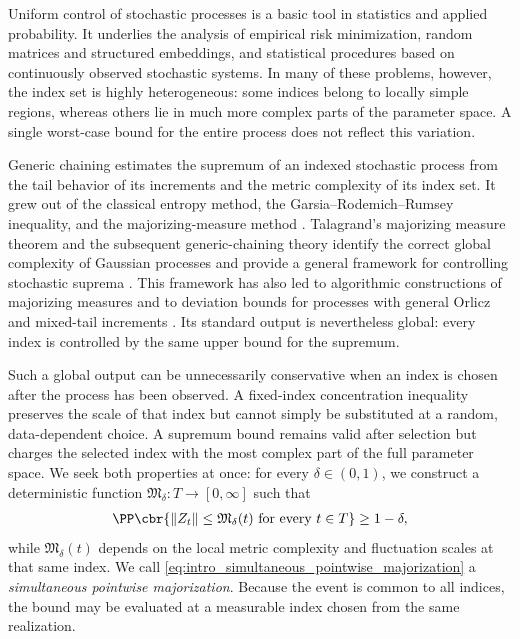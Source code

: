 \documentclass[11pt]{article}
\begin{document}
Uniform control of stochastic processes is a basic tool in statistics
and applied probability. It underlies the analysis of empirical risk
minimization, random matrices and structured embeddings, and statistical
procedures based on continuously observed stochastic systems. In many
of these problems, however, the index set is highly heterogeneous: some
indices belong to locally simple regions, whereas others lie in much
more complex parts of the parameter space. A single worst-case bound for
the entire process does not reflect this variation.

Generic chaining estimates the supremum of an indexed stochastic process
from the tail behavior of its increments and the metric complexity of
its index set. It grew out of the classical entropy method, the
Garsia--Rodemich--Rumsey inequality, and the majorizing-measure method
\citep{dudley1967sizes,garsia1971real,fernique1971regularite,
preston1972continuity,fernique1975regularite}. Talagrand's majorizing
measure theorem and the subsequent generic-chaining theory identify the
correct global complexity of Gaussian processes and provide a general
framework for controlling stochastic suprema
\citep{talagrand1987regularity,talagrand1992simple,
talagrand1994constructions,talagrand1996majorizing,
talagrand2001without,talagrand2005generic}. This framework has also led
to algorithmic constructions of majorizing measures and to deviation
bounds for processes with general Orlicz and mixed-tail increments
\citep{talagrand1990sample,borst2021optimizer,dirksen2015tail}. Its
standard output is nevertheless global: every index is controlled by
the same upper bound for the supremum.

Such a global output can be unnecessarily conservative when an index is
chosen after the process has been observed. A fixed-index concentration
inequality preserves the scale of that index but cannot simply be
substituted at a random, data-dependent choice. A supremum bound remains
valid after selection but charges the selected index with the most
complex part of the full parameter space. We seek both properties at
once: for every $\delta\in(0,1)$, we construct a deterministic function
$\mathfrak M_\delta:T\to[0,\infty]$ such that
\begin{align}
\PP\cbr{
\|Z_t\|\le \mathfrak M_\delta(t)
\text{ for every }t\in T
}
\ge 1-\delta,
\label{eq:intro_simultaneous_pointwise_majorization}
\end{align}
while $\mathfrak M_\delta(t)$ depends on the local metric complexity and
fluctuation scales at that same index. We call
\eqref{eq:intro_simultaneous_pointwise_majorization} a
\emph{simultaneous pointwise majorization}. Because the event is common
to all indices, the bound may be evaluated at a measurable index chosen
from the same realization.
\end{document}

